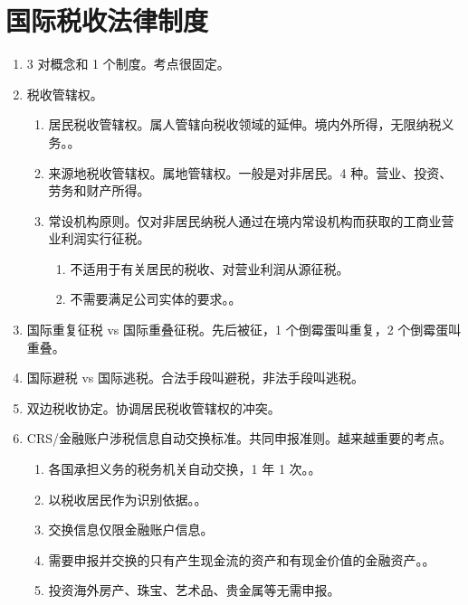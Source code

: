 \section{国际税收法律制度}
\begin{enumerate}
  \item 3 对概念和 1 个制度。考点很固定。
  \item 税收管辖权。
        \begin{enumerate}
          \item 居民税收管辖权。属人管辖向税收领域的延伸。境内外所得，无限纳税义务。。
          \item 来源地税收管辖权。属地管辖权。一般是对非居民。4 种。营业、投资、劳务和财产所得。
          \item 常设机构原则。仅对非居民纳税人通过在境内常设机构而获取的工商业营业利润实行征税。
                \begin{enumerate}
                  \item 不适用于有关居民的税收、对营业利润从源征税。
                  \item 不需要满足公司实体的要求。。
                \end{enumerate}
        \end{enumerate}
  \item 国际重复征税 vs 国际重叠征税。先后被征，1 个倒霉蛋叫重复，2 个倒霉蛋叫重叠。
  \item 国际避税 vs 国际逃税。合法手段叫避税，非法手段叫逃税。
  \item 双边税收协定。协调居民税收管辖权的冲突。
  \item CRS/金融账户涉税信息自动交换标准。共同申报准则。越来越重要的考点。
        \begin{enumerate}
          \item 各国承担义务的税务机关自动交换，1 年 1 次。。
          \item 以税收居民作为识别依据。。
          \item 交换信息仅限金融账户信息。
          \item 需要申报并交换的只有产生现金流的资产和有现金价值的金融资产。。
          \item 投资海外房产、珠宝、艺术品、贵金属等无需申报。
        \end{enumerate}
\end{enumerate}
